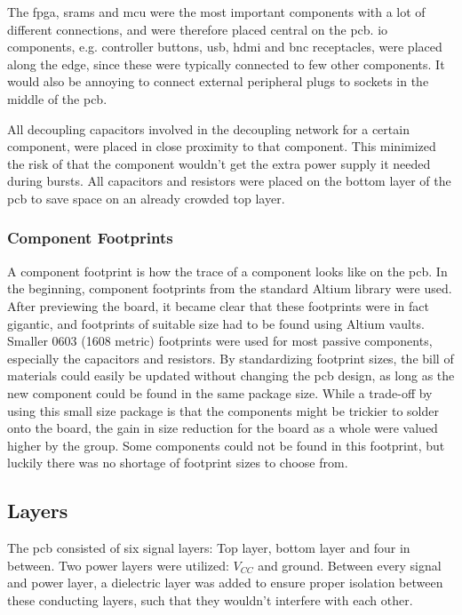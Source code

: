 The \gls{fpga}, \gls{sram}s and \gls{mcu} were the most important components with a lot of different connections, and were therefore placed central on the \gls{pcb}.
\gls{io} components, e.g. controller buttons, \gls{usb}, \gls{hdmi} and \gls{bnc} receptacles, were placed along the edge, since these were typically connected to few other components.
It would also be annoying to connect external peripheral plugs to sockets in the middle of the \gls{pcb}.

All decoupling capacitors involved in the decoupling network for a certain component, were placed in close proximity to that component.
This minimized the risk of that the component wouldn't get the extra power supply it needed during bursts.
All capacitors and resistors were placed on the bottom layer of the \gls{pcb} to save space on an already crowded top layer.

\subsubsection{Component Footprints}
A component footprint is how the trace of a component looks like on the \gls{pcb}.
In the beginning, component footprints from the standard Altium library were used.
After previewing the board, it became clear that these footprints were in fact gigantic, and footprints of suitable size had to be found using Altium vaults.
Smaller 0603 (1608 metric) footprints were used for most passive components, especially the capacitors and resistors.
By standardizing footprint sizes, the bill of materials could easily be updated without changing the \gls{pcb} design, as long as the new component could be found in the same package size.
While a trade-off by using this small size package is that the components might be trickier to solder onto the board, the gain in size reduction for the board as a whole were valued higher by the group.
Some components could not be found in this footprint, but luckily there was no shortage of footprint sizes to choose from.

\subsection{Layers}
The \gls{pcb} consisted of six signal layers: Top layer, bottom layer and four in between.
Two power layers were utilized: \(V_{CC}\) and ground.
Between every signal and power layer, a dielectric layer was added to ensure proper isolation between these conducting layers, such that they wouldn't interfere with each other.

